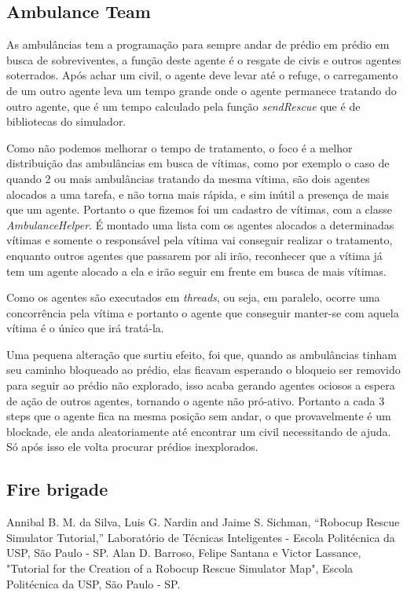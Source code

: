 \documentclass[conference]{IEEEtran}
\begin{document}
\subsection{Ambulance Team}
As ambulâncias tem a programação para sempre andar de prédio em prédio em busca de sobreviventes, a função deste agente é o resgate de civis e outros agentes soterrados. 
Após achar um civil, o agente deve levar até o refuge, o carregamento de um outro agente leva um tempo grande onde o agente permanece tratando do outro agente, que é um tempo calculado pela função \textit{sendRescue} que é de bibliotecas do simulador.

Como não podemos melhorar o tempo de tratamento, o foco é a melhor distribuição das ambulâncias em busca de vítimas, como por exemplo o caso de quando 2 ou mais ambulâncias tratando da mesma vítima, são dois agentes alocados a uma tarefa, e não torna mais rápida, e sim inútil a presença de mais que um agente. Portanto o que fizemos foi um cadastro de vítimas, com a classe \textit{AmbulanceHelper}. É montado uma lista com os agentes alocados a determinadas vítimas e somente o responsável pela vítima vai conseguir realizar o tratamento, enquanto outros agentes que passarem por ali irão, reconhecer que a vítima já tem um agente alocado a ela e irão seguir em frente em busca de mais vítimas.

Como os agentes são executados em \textit{threads}, ou seja, em paralelo, ocorre uma concorrência pela vítima e portanto o agente que conseguir manter-se com aquela vítima é o único que irá tratá-la.

Uma pequena alteração que surtiu efeito, foi que, quando as ambulâncias tinham seu caminho bloqueado ao prédio, elas ficavam esperando o bloqueio ser removido para seguir ao prédio não explorado, isso acaba gerando agentes ociosos a espera de ação de outros agentes, tornando o agente não pró-ativo. Portanto a cada 3 steps que o agente fica na mesma posição sem andar, o que provavelmente é um blockade, ele anda  aleatoriamente até encontrar um civil necessitando de ajuda. Só após isso ele volta procurar prédios inexplorados. 
\subsection{Fire brigade}

\begin{thebibliography}{00}
 Annibal B. M. da Silva, Luis G. Nardin and Jaime S. Sichman, ``Robocup Rescue Simulator Tutorial,'' Laboratório de Técnicas Inteligentes - Escola Politécnica da USP, São Paulo - SP.
 Alan D. Barroso, Felipe Santana e Victor Lassance, "Tutorial for the Creation of a Robocup Rescue Simulator Map", Escola Politécnica da USP, São Paulo - SP.

\end{thebibliography}
\end{document}
